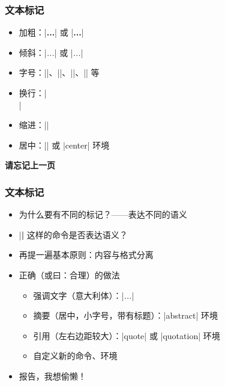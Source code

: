 \begin{frame}[fragile]
\frametitle{文本标记}
\begin{itemize}
  \item 加粗：|{\bfseries ...}| 或 |\textbf{...}|
  \item 倾斜：|{\itshape ...}| 或 |\textit{...}|
  \item 字号：|\tiny|、|\small|、|\large|、|\Large| 等
  \item 换行：|\\|
  \item 缩进：|\indent|
  \item 居中：|\centering| 或 |center| 环境
\end{itemize}
\end{frame}

\begin{frame}[standout]
  \huge \textbf{请忘记上一页}
\end{frame}

\begin{frame}[fragile]
\frametitle{文本标记}
\begin{itemize}
  \item 为什么要有不同的标记？\pause\mbox{}——表达不同的\alert{语义} \pause
  \item |\textbf| 这样的命令是否表达语义？ \pause
  \item 再提一遍基本原则：\alert{内容与格式分离} \pause
  \item 正确（或曰：合理）的做法

    \begin{itemize}
      \item 强调文字（意大利体）：|\emph{...}|
      \item 摘要（居中，小字号，带有标题）：|abstract| 环境
      \item 引用（左右边距较大）：|quote| 或 |quotation| 环境
      \item 自定义新的命令、环境
    \end{itemize} \pause

  \item 报告，我想偷懒！
\end{itemize}
\end{frame}

